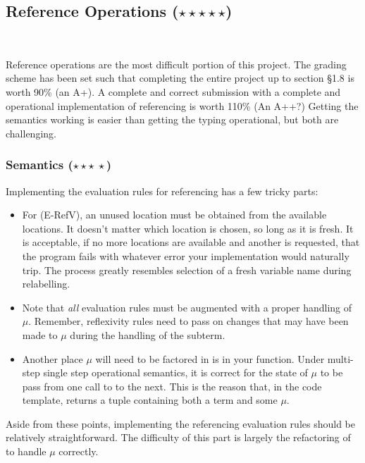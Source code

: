 \documentclass{exam}
\let\OldTexttt\texttt
\renewcommand{\texttt}[1]{\OldTexttt{\color{teal}{#1}}}
\begin{document}
\subsection{Reference Operations ($\star\star\star\star\star$)}

\texttt{[image: figures/Ref1.png]} \\

\texttt{[image: figures/Ref2.png]}

Reference operations are the most difficult portion of this project.  The grading scheme has been set such that completing the entire project up to section \S 1.8 is worth 90\% (an A+).  A complete and correct submission with a complete and operational implementation of referencing is worth 110\% (An A++?) Getting the semantics working is easier than getting the typing operational, but both are challenging.

\subsubsection{Semantics ($\star\star\star\:\star$)}

Implementing the evaluation rules for referencing has a few tricky parts:
\begin{itemize}
\item For (E-RefV), an unused location must be obtained from the available locations.  It doesn't matter which location is chosen, so long as it is fresh.  It is acceptable, if no more locations are available and another is requested, that the program fails with whatever error your implementation would naturally trip.  The process greatly resembles selection of a fresh variable name during relabelling.
\item Note that \emph{all} evaluation rules must be augmented with a proper handling of $\mu$.  Remember, reflexivity rules need to pass on changes that may have been made to $\mu$ during the handling of the subterm.  
\item Another place $\mu$ will need to be factored in is in your \texttt{eval} function.  Under multi-step single step operational semantics, it is correct for the state of $\mu$ to be pass from one call to \texttt{ssos} to the next.  This is the reason that, in the code template, \texttt{ssos} returns a tuple containing both a term and some $\mu$.  
\end{itemize}
Aside from these points, implementing the referencing evaluation rules should be relatively straightforward.  The difficulty of this part is largely the refactoring of \texttt{ssos} to handle $\mu$ correctly.  
\end{document}
